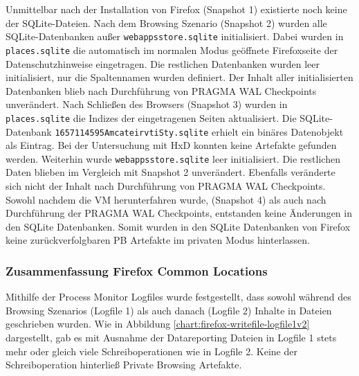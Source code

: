 \begin{appendices}
Unmittelbar nach der Installation von Firefox (Snapshot 1) existierte noch keine der SQLite-Dateien.
Nach dem Browsing Szenario (Snapshot 2) wurden alle SQLite-Datenbanken außer \texttt{webappsstore.sqlite} 
initialisiert. Dabei wurden in \texttt{places.sqlite} die automatisch im normalen Modus geöffnete Firefoxseite der Datenschutzhinweise eingetragen. 
Die restlichen Datenbanken wurden leer initialisiert, nur die Spaltennamen wurden definiert.
Der Inhalt aller initialisierten Datenbanken blieb nach Durchführung von PRAGMA WAL Checkpoints unverändert.
Nach Schließen des Browsers (Snapshot 3) wurden in \texttt{places.sqlite} die Indizes der eingetragenen Seiten aktualisiert. Die SQLite-Datenbank \texttt{1657114595AmcateirvtiSty.sqlite} erhielt ein binäres Datenobjekt als Eintrag. Bei der Untersuchung mit HxD konnten keine Artefakte gefunden werden. Weiterhin wurde \texttt{webappsstore.sqlite} leer initialisiert. Die restlichen Daten blieben im Vergleich mit Snapshot 2 unverändert. Ebenfalls veränderte sich nicht der Inhalt nach Durchführung von PRAGMA WAL Checkpoints.
Sowohl nachdem die VM herunterfahren wurde, (Snapshot 4) als auch nach Durchführung der PRAGMA WAL Checkpoints, entstanden keine Änderungen in den SQLite Datenbanken.	
Somit wurden in den SQLite Datenbanken von Firefox keine zurückverfolgbaren PB Artefakte im privaten Modus hinterlassen.

\subsubsection*{Zusammenfassung Firefox Common Locations}
Mithilfe der Process Monitor Logfiles wurde festgestellt, dass sowohl während des Browsing Szenarios (Logfile 1) als auch danach (Logfile 2) Inhalte in Dateien geschrieben wurden. Wie in Abbildung \ref{chart:firefox-writefile-logfile1v2} dargestellt, gab es mit Ausnahme der Datareporting Dateien in Logfile 1 stets mehr oder gleich viele Schreiboperationen wie in Logfile 2. Keine der Schreiboperation hinterließ Private Browsing Artefakte.

\begin{figure}[h!]
\end{figure}
\end{appendices}
